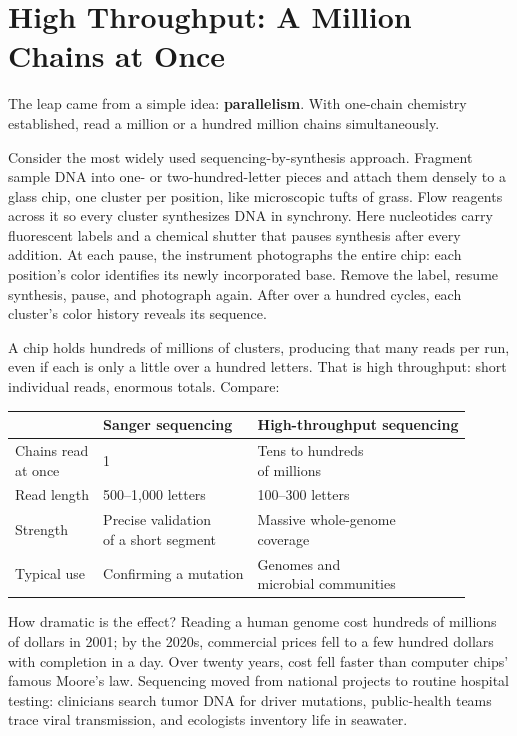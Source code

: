 \section{High Throughput: A Million Chains at Once}

The leap came from a simple idea: \textbf{parallelism}. With one-chain chemistry established, read a million or a hundred million chains simultaneously.

Consider the most widely used sequencing-by-synthesis approach. Fragment sample DNA into one- or two-hundred-letter pieces and attach them densely to a glass chip, one cluster per position, like microscopic tufts of grass. Flow reagents across it so every cluster synthesizes DNA in synchrony. Here nucleotides carry fluorescent labels and a chemical shutter that pauses synthesis after every addition. At each pause, the instrument photographs the entire chip: each position's color identifies its newly incorporated base. Remove the label, resume synthesis, pause, and photograph again. After over a hundred cycles, each cluster's color history reveals its sequence.

A chip holds hundreds of millions of clusters, producing that many reads per run, even if each is only a little over a hundred letters. That is high throughput: short individual reads, enormous totals. Compare:

\begin{table}[htbp]
\centering
\begin{tabular}{lll}
\toprule
 & Sanger sequencing & High-throughput sequencing \\
\midrule
\shortstack[l]{Chains read\\at once} & 1 & \shortstack[l]{Tens to hundreds\\of millions} \\
Read length & 500--1,000 letters & 100--300 letters \\
Strength & \shortstack[l]{Precise validation\\of a short segment} & \shortstack[l]{Massive whole-genome\\coverage} \\
Typical use & Confirming a mutation & \shortstack[l]{Genomes and\\microbial communities} \\
\bottomrule
\end{tabular}
\end{table}

How dramatic is the effect? Reading a human genome cost hundreds of millions of dollars in 2001; by the 2020s, commercial prices fell to a few hundred dollars with completion in a day. Over twenty years, cost fell faster than computer chips' famous Moore's law. Sequencing moved from national projects to routine hospital testing: clinicians search tumor DNA for driver mutations, public-health teams trace viral transmission, and ecologists inventory life in seawater.

